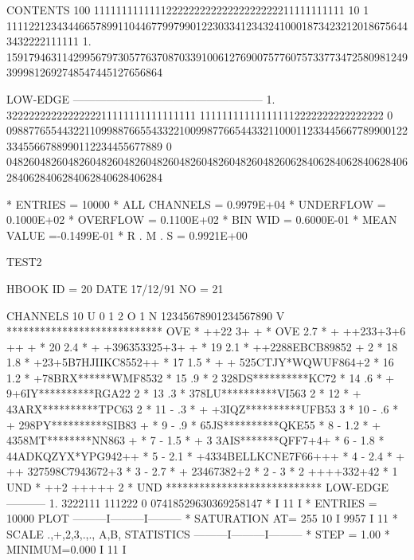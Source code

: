 \begin{Listing}
 CONTENTS 100                               111111111111122222222222222222222211111111111                           
           10      1    1111221234344665789911044677997990122303341234324100018734232120186756443432222111111       
            1.  1591794631142995679730577637087033910061276900757760757337734725809812493999812692748547445127656864
 
 LOW-EDGE       ---------------------------------------------------                                                 
            1.  3222222222222222211111111111111111                                 111111111111111112222222222222222
            0   0988776554432211099887665543322100998776654433211000112334456677899001223345566788990112234455677889
            0   0482604826048260482604826048260482604826048260482606284062840628406284062840628406284062840628406284
 
 * ENTRIES =      10000      * ALL CHANNELS = 0.9979E+04      * UNDERFLOW = 0.1000E+02      * OVERFLOW = 0.1100E+02
 * BIN WID = 0.6000E-01      * MEAN VALUE   =-0.1499E-01      * R . M . S = 0.9921E+00

\newpage
\scriptsize

 TEST2                                                                           
 
 HBOOK     ID = 20                       DATE  17/12/91              NO =  21
 
 CHANNELS  10 U 0        1         2 O 
            1 N 12345678901234567890 V 
            ****************************
   OVE      *         ++22 3+  +       * OVE
     2.7    *     + ++233+3+6 ++ +     *  20
     2.4    *      + +396353325+3+ +   *  19
     2.1    *    ++2288EBCB89852 + 2   *  18
     1.8    *   +23+5B7HJIIKC8552++    *  17
     1.5    * + + 525CTJY*WQWUF864+2   *  16
     1.2    *    +78BRX******WMF8532   *  15
      .9    * 2 328DS**********KC72    *  14
      .6    * + 9+6IY**********RGA22 2 *  13
      .3    *   378LU**********VI563 2 *  12
            * + 43ARX**********TPC63 2 *  11
 -    .3    * + +3IQZ**********UFB53 3 *  10
 -    .6    * + 298PY**********SIB83 + *   9
 -    .9    *    65JS**********QKE55   *   8
 -   1.2    * + 4358MT********NN863  + *   7
 -   1.5    * + 3 3AIS*******QFF7+4+   *   6
 -   1.8    *     44ADKQZYX*YPG942++   *   5
 -   2.1    *   +4334BELLKCNE7F66+++   *   4
 -   2.4    * + ++ 327598C7943672+3    *   3
 -   2.7    *      + 23467382+2        *   2
 -   3      *      2 ++++332+42        *   1
   UND      *        ++2 +++++ 2       * UND
            ****************************
 LOW-EDGE       -----------         
            1.  3222111       111222
            0   07418529630369258147
  *                                                        I   11    I
  * ENTRIES =    10000                 PLOT       ---------I---------I---------
  * SATURATION  AT=          255                     10    I 9957    I   11
  * SCALE  .,+,2,3,.,., A,B,         STATISTICS   ---------I---------I---------
  * STEP = 1.00     * MINIMUM=0.000                        I   11    I


\end{Listing}
